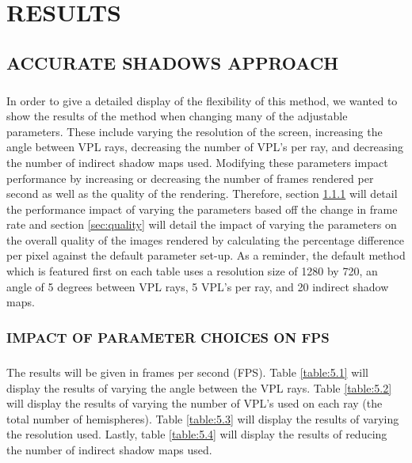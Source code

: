 \chapter{RESULTS}

\section{ACCURATE SHADOWS APPROACH}
\paragraph{}
In order to give a detailed display of the flexibility of this method, we wanted to show the results of the method when changing many of the adjustable parameters.  These include varying the resolution of the screen, increasing the angle between VPL rays, decreasing the number of VPL's per ray, and decreasing the number of indirect shadow maps used. Modifying these parameters impact performance by increasing or decreasing the number of frames rendered per second as well as the quality of the rendering.  Therefore, section \ref{sec:fps} will detail the performance impact of varying the parameters based off the change in frame rate and section \ref{sec:quality} will detail the impact of varying the parameters on the overall quality of the images rendered by calculating the percentage difference per pixel against the default parameter set-up.  As a reminder, the default method which is featured first on each table uses a resolution size of 1280 by 720, an angle of 5 degrees between VPL rays, 5 VPL's per ray, and 20 indirect shadow maps.

\subsection{IMPACT OF PARAMETER CHOICES ON FPS} \label{sec:fps}
\paragraph{}
The results will be given in frames per second (FPS).  Table \ref{table:5.1} will display the results of varying the angle between the VPL rays. Table \ref{table:5.2} will display the results of varying the number of VPL's used on each ray (the total number of hemispheres). Table \ref{table:5.3} will display the results of varying the resolution used.  Lastly, table \ref{table:5.4} will display the results of reducing the number of indirect shadow maps used.

